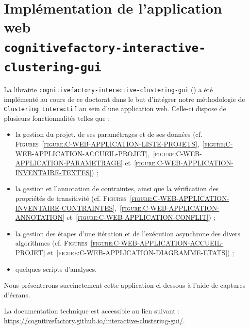 \section[
		\texttt{cognitivefactory-interactive-clustering-gui}
	]{
		Implémentation de l'application web \\ \texttt{cognitivefactory-interactive-clustering-gui}
	}
\label{annex:C.2-DESCRIPTION-IMPLEMENTATION-INTERACTIVE-CLUSTERING-GUI}

	La librairie \texttt{cognitivefactory-interactive-clustering-gui} (\cite{schild-etal:2022:cognitivefactory-interactiveclusteringgui}) a été implémenté au cours de ce doctorat dans le but d'intégrer notre méthodologie de \texttt{Clustering Interactif} au sein d'une application web.
	Celle-ci dispose de plusieurs fonctionnalités telles que :
	\begin{itemize}
		\item la gestion du projet, de ses paramétrages et de ses données (cf. \textsc{Figures}~\textsc{\ref{figure:C-WEB-APPLICATION-LISTE-PROJETS}},~\textsc{\ref{figure:C-WEB-APPLICATION-ACCUEIL-PROJET}},~\textsc{\ref{figure:C-WEB-APPLICATION-PARAMETRAGE}} et~\textsc{\ref{figure:C-WEB-APPLICATION-INVENTAIRE-TEXTES}}) ;
		\item la gestion et l'annotation de contraintes, ainsi que la vérification des propriétés de transitivité (cf. \textsc{Figures}~\textsc{\ref{figure:C-WEB-APPLICATION-INVENTAIRE-CONTRAINTES}},~\textsc{\ref{figure:C-WEB-APPLICATION-ANNOTATION}} et~\textsc{\ref{figure:C-WEB-APPLICATION-CONFLIT}}) ;
		\item la gestion des étapes d'une itération et de l'exécution asynchrone des divers algorithmes (cf. \textsc{Figures}~\textsc{\ref{figure:C-WEB-APPLICATION-ACCUEIL-PROJET}} et~\textsc{\ref{figure:C-WEB-APPLICATION-DIAGRAMME-ETATS}}) ;
		\item quelques scripts d'analyses.
	\end{itemize}
	
	Nous présenterons succinctement cette application ci-dessous à l'aide de captures d'écrans.

	
	\begin{leftBarInformation}
		La documentation technique est accessible au lien suivant : \url{https://cognitivefactory.github.io/interactive-clustering-gui/}.
	\end{leftBarInformation}
	
